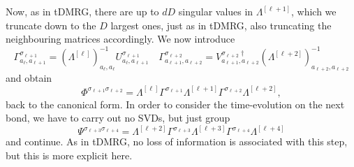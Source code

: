 \documentclass[a4paper,10pt,oneside,onecolumn,1p,times]{elsarticle}
\begin{document}
Now, as in tDMRG, there are up to $dD$ singular values in $ \Lambda^{[\ell+1]}$, which we truncate down to the $D$ largest ones, just as in tDMRG, also truncating the neighbouring matrices accordingly. We now introduce
\begin{equation}
\Gamma^{\sigma_{\ell+1}}_{a_\ell,a_{\ell+1}} =  (\Lambda^{[\ell]})^{-1}_{a_\ell,a_\ell} U^{\sigma_{\ell+1}}_{a_\ell,a_{\ell+1}} \quad 
\Gamma^{\sigma_{\ell+2}}_{a_{\ell+1},a_{\ell+2}} =  V^{\sigma_{\ell+2}\dagger}_{a_{\ell+1},a_{\ell+2}} ( \Lambda^{[\ell+2]})^{-1}_{a_{\ell+2},a_{\ell+2}} 
\end{equation}
and obtain
\begin{equation}
\Phi^{\sigma_{\ell+1}\sigma_{\ell+2}} = \Lambda^{[\ell]}  \Gamma^{\sigma_{\ell+1}} 
 \Lambda^{[\ell+1]} \Gamma^{\sigma_{\ell+2}}  \Lambda^{[\ell+2]} ,
\end{equation}
back to the canonical form. In order to consider the time-evolution on the next bond, we have to carry out no SVDs, but just group
\begin{equation}
\Psi^{\sigma_{\ell+3} \sigma_{\ell+4}} = \Lambda^{[\ell+2]}  \Gamma^{\sigma_{\ell+3}} \Lambda^{[\ell+3]}
\Gamma^{\sigma_{\ell+4}} \Lambda^{[\ell+4]}  
\end{equation}
and continue. As in tDMRG, no loss of information is associated with this step, but this is more explicit here.
\end{document}
